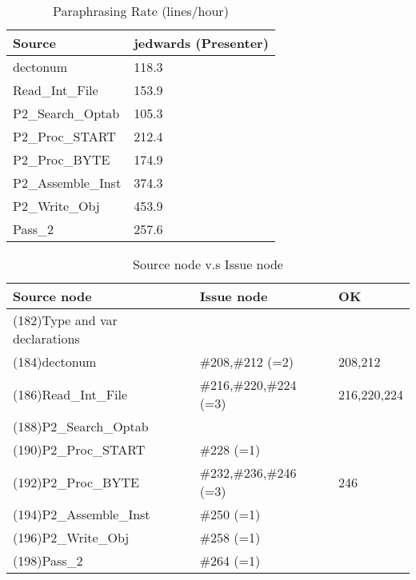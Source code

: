 \begin{table}[hb]
\begin{center}
\begin{tabular}{|l|l|}
\hline
Source & jedwards (Presenter)\\
\hline
dectonum & 118.3\\
Read\_Int\_File & 153.9\\
P2\_Search\_Optab & 105.3\\
P2\_Proc\_START & 212.4\\
P2\_Proc\_BYTE & 174.9\\
P2\_Assemble\_Inst & 374.3\\
P2\_Write\_Obj & 453.9\\
Pass\_2 & 257.6\\
\hline
\end{tabular}
\end{center}
\caption{Paraphrasing Rate (lines/hour)}
\end{table}



\begin{table}[hb]
\begin{center}
\begin{tabular}{|l|l|l|}
\hline
Source node & Issue node  & OK \\
\hline
(182)Type and var declarations &  & \\
(184)dectonum & \#208,\#212 (=2) & 208,212\\
(186)Read\_Int\_File & \#216,\#220,\#224 (=3) & 216,220,224\\
(188)P2\_Search\_Optab &  & \\
(190)P2\_Proc\_START & \#228 (=1) & \\
(192)P2\_Proc\_BYTE & \#232,\#236,\#246 (=3) & 246\\
(194)P2\_Assemble\_Inst & \#250 (=1) & \\
(196)P2\_Write\_Obj & \#258 (=1) & \\
(198)Pass\_2 & \#264 (=1) & \\
\hline
\end{tabular}
\caption{Source node v.s Issue node}
\end{center}
\end{table}

%
